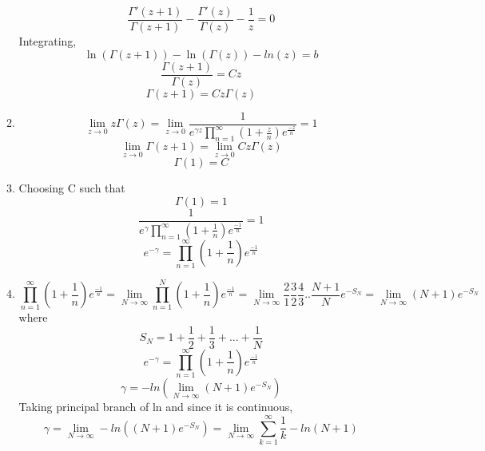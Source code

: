 \documentclass[a4paper]{article}
\begin{document}
\begin{enumerate}
\begin{enumerate}
			\[ \frac{\Gamma'(z+1)}{\Gamma(z+1)} -\frac{\Gamma'(z)}{\Gamma(z)} -\frac{1}{z} =0 \]	
			Integrating,
			\[\ln(\Gamma(z+1))-\ln(\Gamma(z))-ln(z)=b	\] 	   
			\[\frac{\Gamma(z+1)}{\Gamma(z)} = Cz\]   
			\[   \Gamma(z+1)= Cz\Gamma(z) \]  
\item 
\[\lim_{z\to0} z\Gamma(z) = \lim_{z\to 0} \frac{1}{e^{\gamma z} \prod_{n=1}^{\infty} (1+ \frac{z}{n})e^{\frac{-z}{n}} } =1 \]
\[\lim_{z\to0}  \Gamma(z+1)= \lim_{z\to0}  Cz\Gamma(z) \]   
\[ \Gamma(1)=  C \]     
\item
Choosing C such that
 \[ \Gamma(1)=  1 \] 
 \[\frac{1}{e^{\gamma} \prod_{n=1}^{\infty} (1+ \frac{1}{n})e^{\frac{-1}{n}} } =1 \]
 \[e^{-\gamma}   =\prod_{n=1}^{\infty} (1+ \frac{1}{n})e^{\frac{-1}{n}} \]
 \item
    \[\prod_{n=1}^{\infty} (1+ \frac{1}{n})e^{\frac{-1}{n}}=\lim_{N\to \infty}\prod_{n=1}^{N} (1+ \frac{1}{n})e^{\frac{-1}{n}} = \lim_{N\to \infty}\frac{2}{1}\frac{3}{2}\frac{4}{3}..\frac{N+1}{N}e^{-S_N} = \lim_{N\to \infty}(N+1)e^{-S_N} \]     
    where \[S_N = 1+ \frac{1}{2}   + \frac{1}{3} +  ...   + \frac{1}{N}	\]	
     \[e^{-\gamma}   =\prod_{n=1}^{\infty} (1+ \frac{1}{n})e^{\frac{-1}{n}} \]
     \[ \gamma = -ln(\lim_{N\to \infty}(N+1)e^{-S_N})\]
     Taking principal branch of ln and since it is continuous,
     \[ \gamma =\lim_{N\to \infty} -ln((N+1)e^{-S_N}) =\lim_{N\to \infty}\sum_{k=1}^\infty \frac{1}{k} -ln(N+1)  \] 
\end{enumerate}
	\end{enumerate} 
\end{document}
